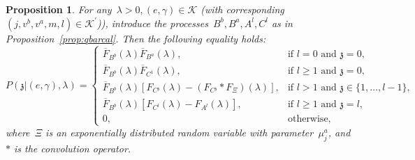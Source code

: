 \documentclass{amsart}[11pt]
\numberwithin{equation}{section}
\newtheorem{proposition}[theorem]{Proposition}
\theoremstyle{definition}
\newcommand{\Kk}{\mathcal{K}}
\newcommand{\zz}{\mathfrak{z}}
\begin{document}
\begin{proposition}\label{prop:Pcal}
For any~$\lambda>0, (e, \gamma)\in \Kk$ (with corresponding~$(j, v^b, v^a, m, l)\in \Kk^\prime$)), 
introduce the processes~$B^b, B^a, A^l, C^l$ as in Proposition~\ref{prop:qbarcal}.
Then the following equality holds:
\begin{equation*}
P(\zz\lvert (e, \gamma), \lambda)
 = 
 \left\{
 \begin{array}{ll}
\overline{F}_{B^b}(\lambda)\overline{F}_{B^a}(\lambda), & \text{if }l=0\text{ and }\zz = 0,\\
\overline{F}_{B^b}(\lambda)\overline{F}_{C^1}(\lambda), & \text{if }l\geq1\text{ and }\zz = 0,\\
\overline{F}_{B^b}(\lambda)\left[F_{C^\zz}(\lambda) - \left(F_{C^\zz} \ast F_{\Xi}\right)(\lambda)\right], & \text{if }l>1\text{ and }\zz\in \{1, \dots, l -1\},\\
\overline{F}_{B^b}(\lambda)\left[F_{C^l}(\lambda) - F_{A^l}(\lambda)\right], & \text{if }l\geq1\text{ and }\zz = l,\\
0, & \text{otherwise},
 \end{array}
\right.
\end{equation*}
where~$\Xi$ is an exponentially distributed random variable with parameter~$\mu_j^a$, 
and~$\ast$ is the convolution operator.
\end{proposition}

\end{document}
